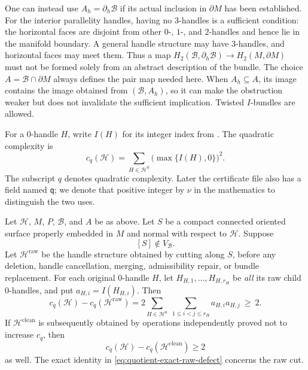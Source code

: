 \begin{remark}
\label{rem:quotient-horizontal}
One can instead use $A_h=\partial_h\mathcal B$ if its actual inclusion in
$\partial M$ has been established. For the interior parallelity handles,
having no $3$-handles is a sufficient condition: the horizontal faces are
disjoint from other $0$-, $1$-, and $2$-handles and hence lie in the
manifold boundary. A general handle structure may have $3$-handles, and
horizontal faces may meet them. Thus a map
$H_2(\mathcal B,\partial_h\mathcal B)\to H_2(M,\partial M)$ must not be
formed solely from an abstract description of the bundle.
The choice $A=\mathcal B\cap\partial M$ always defines the pair map needed
here. When $A_h\subseteq A$, its image contains the image obtained from
$(\mathcal B,A_h)$, so it can make the obstruction weaker but does not
invalidate the sufficient implication. Twisted $I$-bundles are allowed.
\end{remark}

For a $0$-handle $H$, write $I(H)$ for its integer index from
\cite[Definition~5.1]{lackenby2026}. The quadratic complexity is
\[
 c_q(\mathcal H)=\sum_{H\in\mathcal H^0}
                  \bigl(\max\{I(H),0\}\bigr)^2.
\]
The subscript $q$ denotes quadratic complexity. Later the certificate
file also has a field named \texttt{q}; we denote that positive integer
by $\nu$ in the mathematics to distinguish the two uses.

\begin{theorem}
\label{thm:quotient-strict-progress}
Let $\mathcal H$, $M$, $P$, $\mathcal B$, and $A$ be as above. Let $S$ be
a compact connected oriented surface properly embedded in $M$ and normal
with respect to $\mathcal H$. Suppose
\[
 [S]\notin V_{\mathcal B}.
\]
Let $\mathcal H^{\mathrm{raw}}$ be the handle structure obtained by
cutting along $S$, before any deletion, handle cancellation, merging,
admissibility repair, or bundle replacement. For each original $0$-handle
$H$, let
$H_{H,1},\ldots,H_{H,r_H}$ be \emph{all} its raw child $0$-handles, and put
$a_{H,i}=I(H_{H,i})$. Then
\begin{equation}
 \label{eq:quotient-exact-raw-defect}
 c_q(\mathcal H)-c_q(\mathcal H^{\mathrm{raw}})
 =2\sum_{H\in\mathcal H^0}\ \sum_{1\leq i<j\leq r_H}a_{H,i}a_{H,j}
 \ \geq\ 2.
\end{equation}
If $\mathcal H^{\mathrm{clean}}$ is subsequently obtained by operations
independently proved not to increase $c_q$, then
\[
 c_q(\mathcal H)-c_q(\mathcal H^{\mathrm{clean}})\geq 2
\]
as well. The exact identity in
\eqref{eq:quotient-exact-raw-defect} concerns the raw cut.
\end{theorem}

